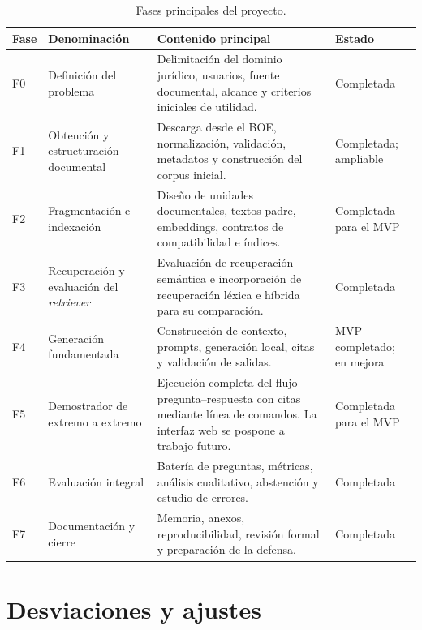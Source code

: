 \begin{table}[htbp]
    \centering
    \small
    \renewcommand{\arraystretch}{1.18}
    \caption{Fases principales del proyecto.}
    \label{tab:fases-proyecto}
    \begin{tabularx}{\textwidth}{|p{1.3cm}|p{4.0cm}|X|p{2.0cm}|}
        \hline
        \textbf{Fase} & \textbf{Denominación} & \textbf{Contenido principal} & \textbf{Estado} \\
        \hline
        F0 & Definición del problema & Delimitación del dominio jurídico, usuarios, fuente documental, alcance y criterios iniciales de utilidad. & Completada \\
        \hline
        F1 & Obtención y estructuración documental & Descarga desde el BOE, normalización, validación, metadatos y construcción del corpus inicial. & Completada; ampliable \\
        \hline
        F2 & Fragmentación e indexación & Diseño de unidades documentales, textos padre, embeddings, contratos de compatibilidad e índices. & Completada para el MVP \\
        \hline
        F3 & Recuperación y evaluación del \emph{retriever} & Evaluación de recuperación semántica e incorporación de recuperación léxica e híbrida para su comparación. & Completada \\
        \hline
        F4 & Generación fundamentada & Construcción de contexto, prompts, generación local, citas y validación de salidas. & MVP completado; en mejora \\
        \hline
        F5 & Demostrador de extremo a extremo & Ejecución completa del flujo pregunta--respuesta con citas mediante línea de comandos. La interfaz web se pospone a trabajo futuro. & Completada para el MVP \\
        \hline
        F6 & Evaluación integral & Batería de preguntas, métricas, análisis cualitativo, abstención y estudio de errores. & Completada \\
        \hline
        F7 & Documentación y cierre & Memoria, anexos, reproducibilidad, revisión formal y preparación de la defensa. & Completada \\
        \hline
    \end{tabularx}
\end{table}

\section{Desviaciones y ajustes}
\label{sec:app-desviaciones}


